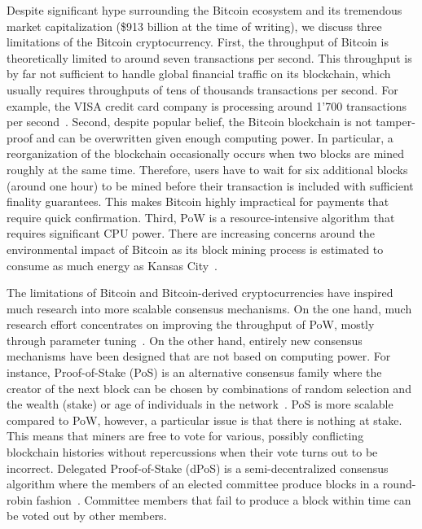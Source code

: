 Despite significant hype surrounding the Bitcoin ecosystem and its tremendous market capitalization (\$913 billion at the time of writing), we discuss three limitations of the Bitcoin cryptocurrency.
First, the throughput of Bitcoin is theoretically limited to around seven transactions per second.
This throughput is by far not sufficient to handle global financial traffic on its blockchain, which usually requires throughputs of tens of thousands transactions per second.
For example, the VISA credit card company is processing around 1'700 transactions per second~\cite{sedgwick2018no}.
Second, despite popular belief, the Bitcoin blockchain is not tamper-proof and can be overwritten given enough computing power.
In particular, a reorganization of the blockchain occasionally occurs when two blocks are mined roughly at the same time.
Therefore, users have to wait for six additional blocks (around one hour) to be mined before their transaction is included with sufficient finality guarantees.
This makes Bitcoin highly impractical for payments that require quick confirmation.
Third, PoW is a resource-intensive algorithm that requires significant CPU power.
There are increasing concerns around the environmental impact of Bitcoin as its block mining process is estimated to consume as much energy as Kansas City~\cite{stoll2019carbon}.

The limitations of Bitcoin and Bitcoin-derived cryptocurrencies have inspired much research into more scalable consensus mechanisms.
On the one hand, much research effort concentrates on improving the throughput of PoW, mostly through parameter tuning~\cite{karame2016security}.
On the other hand, entirely new consensus mechanisms have been designed that are not based on computing power.
For instance, Proof-of-Stake (PoS) is an alternative consensus family where the creator of the next block can be chosen by combinations of random selection and the wealth (stake) or age of individuals in the network~\cite{king2012ppcoin}.
PoS is more scalable compared to PoW, however, a particular issue is that there is nothing at stake.
This means that miners are free to vote for various, possibly conflicting blockchain histories without repercussions when their vote turns out to be incorrect.
Delegated Proof-of-Stake (dPoS) is a semi-decentralized consensus algorithm where the members of an elected committee produce blocks in a round-robin fashion~\cite{larimer2014delegated}.
Committee members that fail to produce a block within time can be voted out by other members.

